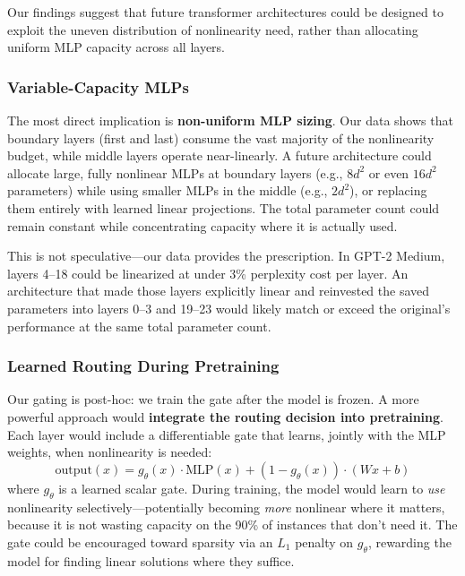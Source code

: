 \documentclass[11pt]{article}
\begin{document}
Our findings suggest that future transformer architectures could be designed to exploit the uneven distribution of nonlinearity need, rather than allocating uniform MLP capacity across all layers.

\subsubsection{Variable-Capacity MLPs}

The most direct implication is \textbf{non-uniform MLP sizing}. Our data shows that boundary layers (first and last) consume the vast majority of the nonlinearity budget, while middle layers operate near-linearly. A future architecture could allocate large, fully nonlinear MLPs at boundary layers (e.g., $8d^2$ or even $16d^2$ parameters) while using smaller MLPs in the middle (e.g., $2d^2$), or replacing them entirely with learned linear projections. The total parameter count could remain constant while concentrating capacity where it is actually used.

This is not speculative---our data provides the prescription. In GPT-2 Medium, layers 4--18 could be linearized at under 3\% perplexity cost per layer. An architecture that made those layers explicitly linear and reinvested the saved parameters into layers 0--3 and 19--23 would likely match or exceed the original's performance at the same total parameter count.

\subsubsection{Learned Routing During Pretraining}

Our gating is post-hoc: we train the gate after the model is frozen. A more powerful approach would \textbf{integrate the routing decision into pretraining}. Each layer would include a differentiable gate that learns, jointly with the MLP weights, when nonlinearity is needed:
\begin{equation}
\mathrm{output}(x) = g_\theta(x) \cdot \mathrm{MLP}(x) + (1 - g_\theta(x)) \cdot (Wx + b)
\end{equation}
where $g_\theta$ is a learned scalar gate. During training, the model would learn to \textit{use} nonlinearity selectively---potentially becoming \textit{more} nonlinear where it matters, because it is not wasting capacity on the 90\% of instances that don't need it. The gate could be encouraged toward sparsity via an $L_1$ penalty on $g_\theta$, rewarding the model for finding linear solutions where they suffice.
\end{document}
